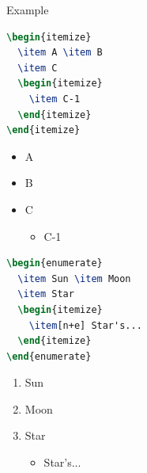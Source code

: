 \documentclass{beamer}
\begin{document}
\begin{frame}[fragile]{Example}
    \begin{minipage}{0.5\linewidth}
\begin{lstlisting}[language=TeX]
\begin{itemize}
  \item A \item B
  \item C
  \begin{itemize}
    \item C-1
  \end{itemize}
\end{itemize}
\end{lstlisting}
    \end{minipage}\hspace{1cm}
    \begin{minipage}{0.3\linewidth}
        \begin{itemize}
            \item A
            \item B
            \item C
            \begin{itemize}
                \item C-1
            \end{itemize}
        \end{itemize}
    \end{minipage}
    \medskip
    \pause
    \begin{minipage}{0.5\linewidth}
\begin{lstlisting}[language=TeX]
\begin{enumerate}
  \item Sun \item Moon
  \item Star
  \begin{itemize}
    \item[n+e] Star's...
  \end{itemize}
\end{enumerate}
\end{lstlisting}
    \end{minipage}\hspace{1cm}
    \begin{minipage}{0.3\linewidth}
        \begin{enumerate}
            \item Sun
            \item Moon
            \item Star
            \begin{itemize}
                \item[n+e] Star's...
            \end{itemize}
        \end{enumerate}
    \end{minipage}
\end{frame}
\end{document}
